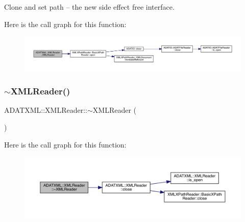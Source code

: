 Clone and set path -- the new side effect free interface. 

Here is the call graph for this function\+:
\nopagebreak
\begin{figure}[H]
\begin{center}
\leavevmode
\includegraphics[width=350pt]{db/d3f/classADATXML_1_1XMLReader_aef69d83a0f47db461436fc2fd3bb7723_cgraph}
\end{center}
\end{figure}
\mbox{\label{classADATXML_1_1XMLReader_a98c4936a3366f39443113290b7bd164a}} 
\subsubsection{\texorpdfstring{$\sim$XMLReader()}{~XMLReader()}\hspace{0.1cm}{\footnotesize\ttfamily [1/2]}}
{\footnotesize\ttfamily A\+D\+A\+T\+X\+M\+L\+::\+X\+M\+L\+Reader\+::$\sim$\+X\+M\+L\+Reader (\begin{DoxyParamCaption}{ }\end{DoxyParamCaption})\hspace{0.3cm}{\ttfamily [inline]}}

Here is the call graph for this function\+:
\nopagebreak
\begin{figure}[H]
\begin{center}
\leavevmode
\includegraphics[width=350pt]{db/d3f/classADATXML_1_1XMLReader_a98c4936a3366f39443113290b7bd164a_cgraph}
\end{center}
\end{figure}
\mbox{\label{classADATXML_1_1XMLReader_a1934189445871612ae9b93f35e17c468}} 
